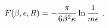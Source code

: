 \begin{equation}\label{2.26}
F(\beta,\epsilon,R)=-{\pi \over 6\beta^2 \kappa}\ln {1 \over m \epsilon}
~.
\end{equation}

